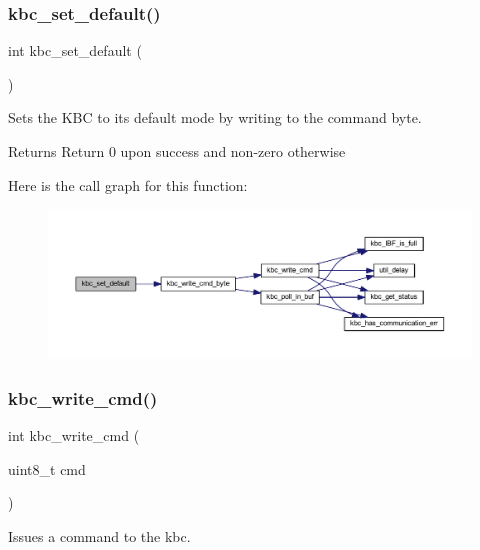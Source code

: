 \subsubsection{\texorpdfstring{kbc\+\_\+set\+\_\+default()}{kbc\_set\_default()}}
{\footnotesize\ttfamily int kbc\+\_\+set\+\_\+default (\begin{DoxyParamCaption}{ }\end{DoxyParamCaption})}



Sets the K\+BC to its default mode by writing to the command byte. 

\begin{DoxyReturn}{Returns}
Return 0 upon success and non-\/zero otherwise 
\end{DoxyReturn}
Here is the call graph for this function\+:\nopagebreak
\begin{figure}[H]
\begin{center}
\leavevmode
\includegraphics[width=350pt]{group__keyboard_gabed7ca5d360dbf3737554bd242d48fc1_cgraph}
\end{center}
\end{figure}
\mbox{\label{group__keyboard_gaa1dcd642657d7da0376e36cda809b0e3}} 
\subsubsection{\texorpdfstring{kbc\+\_\+write\+\_\+cmd()}{kbc\_write\_cmd()}}
{\footnotesize\ttfamily int kbc\+\_\+write\+\_\+cmd (\begin{DoxyParamCaption}\item[{uint8\+\_\+t}]{cmd }\end{DoxyParamCaption})}



Issues a command to the kbc. 


